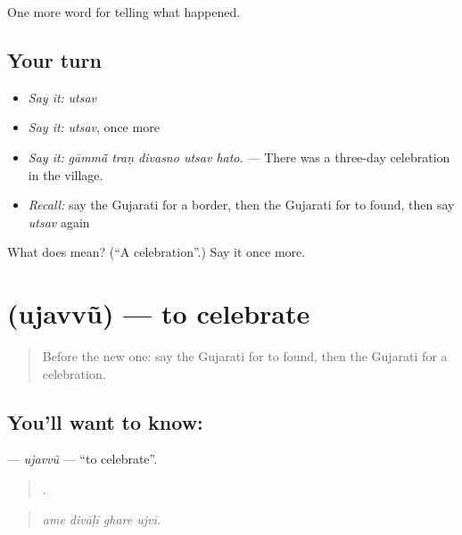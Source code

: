 \begin{grammarlens}[title={What you've built}]
One more word for telling what happened.
\end{grammarlens}

\subsection*{Your turn}
\begin{itemize}
\raggedright
  \item \emph{Say it:} \emph{utsav}
  \item \emph{Say it:} \emph{utsav}, once more
  \item \emph{Say it:} \emph{gāmmā̃ traṇ divasno utsav hato.} — There was a three-day celebration in the village.
  \item \emph{Recall:} say the Gujarati for a border, then the Gujarati for to found, then say \emph{utsav} again
\end{itemize}

\begin{tcolorbox}[breakable,colback=teal!4,colframe=teal!35!black,title={Before you move on}]
What does  mean? (\textquotedblleft{}A celebration\textquotedblright{}.) Say it once more.
\end{tcolorbox}
\section[\texorpdfstring{\gu{ઉજવવું} (ujavvũ)}{ઉજવવું (ujavvũ)}]{ (ujavvũ) — to celebrate}

\label{lesson:GU-C327-ujavvu}



\begin{quote}
Before the new one: say the Gujarati for to found, then the Gujarati for a celebration.
\end{quote}

\subsection*{You'll want to know: }
\textbf{} — \emph{ujavvũ} — \textquotedblleft{}to celebrate\textquotedblright{}.

\begin{quote}
   .
\end{quote}

\begin{quote}
\emph{ame divāḷī ghare ujvī.}
\end{quote}

